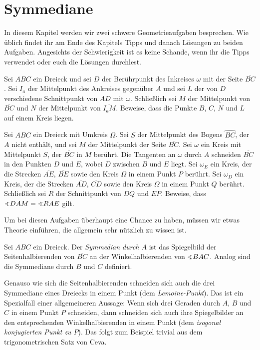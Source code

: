 \section{Symmediane}\label{kapitel:Symmediane}
In diesem Kapitel werden wir zwei schwere Geometrieaufgaben besprechen. Wie üblich findet ihr am Ende des Kapitels Tipps und danach Lösungen zu beiden Aufgaben. Angesichts der Schwierigkeit ist es keine Schande, wenn ihr die Tipps verwendet oder euch die Lösungen durchlest.
\begin{aufgabe*}[**]\label{aufgabe:MEMO2014}
	Sei $ABC$ ein Dreieck und sei $D$ der Berührpunkt des Inkreises $\omega$ mit der Seite $\overline{BC}$. Sei $I_a$ der Mittelpunkt des Ankreises gegenüber $A$ und sei $L$ der von $D$ verschiedene Schnittpunkt von $AD$ mit $\omega$. Schließlich sei $M$ der Mittelpunkt von $\overline{BC}$ und $N$ der Mittelpunkt von $\overline{I_aM}$. Beweise, dass die Punkte $B$, $C$, $N$ und $L$ auf einem Kreis liegen.
\end{aufgabe*}
\begin{aufgabe*}[***]\label{aufgabe:PolenMO2019}
	Sei $ABC$ ein Dreieck mit Umkreis $\Omega$. Sei $S$ der Mittelpunkt des Bogens $\wideparen{BC}$, der $A$ nicht enthält, und sei $M$ der Mittelpunkt der Seite $\overline{BC}$. Sei $\omega$ ein Kreis mit Mittelpunkt $S$, der $\overline{BC}$ in $M$ berührt. Die Tangenten an $\omega$ durch $A$ schneiden $\overline{BC}$ in den Punkten $D$ und $E$, wobei $D$ zwischen $B$ und $E$ liegt. Sei $\omega_E$ ein Kreis, der die Strecken $\overline{AE}$, $\overline{BE}$ sowie den Kreis $\Omega$ in einem Punkt $P$ berührt. Sei $\omega_D$ ein Kreis, der die Strecken $\overline{AD}$, $\overline{CD}$ sowie den Kreis $\Omega$ in einem Punkt $Q$ berührt. Schließlich sei $R$ der Schnittpunkt von $DQ$ und $EP$. Beweise, dass $\winkel DAM=\winkel RAE$ gilt.
\end{aufgabe*}
Um bei diesen Aufgaben überhaupt eine Chance zu haben, müssen wir etwas Theorie einführen, die allgemein sehr nützlich zu wissen ist.	

\begin{definition}
	Sei $ABC$ ein Dreieck. Der \emph{Symmedian durch $A$} ist das Spiegelbild der Seitenhalbierenden von $\overline{BC}$ an der Winkelhalbierenden von $\winkel BAC$. Analog sind die Symmediane durch $B$ und $C$ definiert.
\end{definition}
Genauso wie sich die Seitenhalbierenden schneiden sich auch die drei Symmediane eines Dreiecks in einem Punkt (dem \emph{Lemoine-Punkt}). Das ist ein Spezialfall einer allgemeineren Aussage: Wenn sich drei Geraden durch $A$, $B$ und $C$ in einem Punkt $P$ schneiden, dann schneiden sich auch ihre Spiegelbilder an den entsprechenden Winkelhalbierenden in einem Punkt (dem \emph{isogonal konjugierten Punkt zu $P$}). Das folgt zum Beispiel trivial aus dem trigonometrischen Satz von Ceva.

